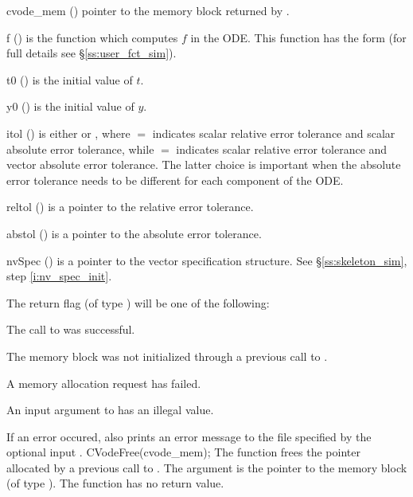 {
  \begin{args}[abstol]
  \item[cvode\_mem] ()
    pointer to the {\cvode} memory block returned by .
  \item[f] ()
    is the {\C} function which computes $f$ in the ODE. This function has the form 
     (for full details see \S\ref{ss:user_fct_sim}).
  \item[t0] ()
    is the initial value of $t$.
  \item[y0] ()
    is the initial value of $y$. 
  \item[itol] () 
    is either  or , where $=$ indicates scalar relative error 
    tolerance and scalar absolute error tolerance, while $=$ indicates scalar
    relative error tolerance and vector absolute error tolerance. 
    The latter choice is important when the absolute error tolerance needs to
    be different for each component of the ODE. 
  \item[reltol] ()
    is a pointer to the relative error tolerance.
  \item[abstol] ()
    is a pointer to the absolute error tolerance.
  \item[nvSpec] ()
    is a pointer to the vector specification structure. See \S\ref{ss:skeleton_sim}, 
    step \ref{i:nv_spec_init}.
  \end{args}
}
{
  The return flag  (of type ) will be one of the following:
  \begin{args}
  \item[\Id{SUCCESS}]
    The call to  was successful.
  \item[\Id{CVM\_NO\_MEM}] 
    The {\cvode} memory block was not initialized through a previous call to .
  \item[\Id{CVM\_MEM\_FAIL}] 
    A memory allocation request has failed.
  \item[\Id{CVM\_ILL\_INPUT}] 
    An input argument to  has an illegal value.
  \end{args}
}
{
  If an error occured,  also prints an error message to the
  file specified by the optional input .
}
{
  CVodeFree(cvode\_mem);
}
{
  The function  frees the pointer allocated by
  a previous call to .
}
{
  The argument is the pointer to the {\cvode} memory block (of type ).
}
{
  The function  has no return value.
}
{}
